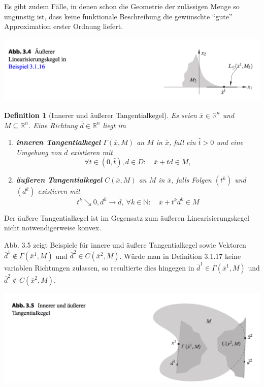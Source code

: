 \documentclass[11pt]{scrreprt}
\newcounter{thm}
\theoremstyle{thmstyle}
\numberwithin{thm}{section}
\newtheorem{definition}[thm]{Definition}
\begin{document}
Es gibt zudem Fälle, in denen schon die Geometrie der zulässigen Menge so ungünstig ist, dass keine funktionale Beschreibung die gewünschte \enquote{gute} Approximation erster Ordnung liefert.

\begin{center}
	\includegraphics[scale=0.5]{ab34}
\end{center}

\setcounter{thm}{16}

\begin{definition}[Innerer und äußerer Tangentialkegel]
	Es seien $\overline{x} \in \mathbb{R}^n$ und $M \subseteq \mathbb{R}^n$. Eine Richtung $\overline{d} \in \mathbb{R}^n$ liegt im
	\begin{enumerate}[label=\alph*\upshape)]
		\item \textbf{inneren Tangentialkegel} $\Gamma(\overline{x}, M)$ an $M$ in $\overline{x}$, fall ein $\hat{t} > 0$ und eine Umgebung von $\overline{d}$ existieren mit 
			$$ \forall t \in (0, \hat{t}), d \in D: \quad \overline{x} +td \in M, $$
		\item \textbf{äußeren Tangentialkegel} $C(\overline{x}, M)$ an $M$ in $\overline{x}$, falls Folgen $(t^k)$ und $(d^k)$ existieren mit
			$$ t^k \searrow 0, d^k \rightarrow \overline{d}, ~\forall k \in \mathbb{N}: \quad \overline{x} + t^k d^k \in M $$
	\end{enumerate}	
\end{definition}

Der äußere Tangentialkegel ist im Gegensatz zum äußeren Linearisierungskegel nicht notwendigerweise konvex.

Abb. 3.5 zeigt Beispiele für innere und äußere Tangentialkegel sowie Vektoren $\overline{d}^1 \notin \Gamma(\overline{x}^1, M)$ und $\overline{d}^2 \in C(\overline{x}^2, M)$. Würde man in Definition 3.1.17 keine variablen Richtungen zulassen, so resultierte dies hingegen in $\overline{d}^1 \in \Gamma(\overline{x}^1, M)$ und $\overline{d}^2 \notin C(\overline{x}^2, M)$.

\begin{center}
	\includegraphics[scale=0.5]{ab35}
\end{center}
\end{document}
